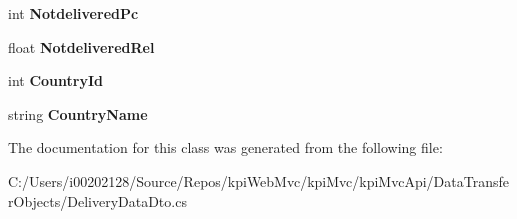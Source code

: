 \begin{DoxyCompactItemize}
int {\bfseries Notdelivered\+Pc}
\item 
\mbox{\label{classkpi_mvc_api_1_1_data_transfer_objects_1_1_delivery_data_dto_a6bc54f620f5d5d89aa67ba81f401f8b2}} 
float {\bfseries Notdelivered\+Rel}
\item 
\mbox{\label{classkpi_mvc_api_1_1_data_transfer_objects_1_1_delivery_data_dto_afeae29ab82e6d8fc83f766328f25f98d}} 
int {\bfseries Country\+Id}
\item 
\mbox{\label{classkpi_mvc_api_1_1_data_transfer_objects_1_1_delivery_data_dto_ac8438c0ad672349a06d9eee773be83d5}} 
string {\bfseries Country\+Name}
\end{DoxyCompactItemize}


The documentation for this class was generated from the following file\+:\begin{DoxyCompactItemize}
\item 
C\+:/\+Users/i00202128/\+Source/\+Repos/kpi\+Web\+Mvc/kpi\+Mvc/kpi\+Mvc\+Api/\+Data\+Transfer\+Objects/Delivery\+Data\+Dto.\+cs\end{DoxyCompactItemize}
